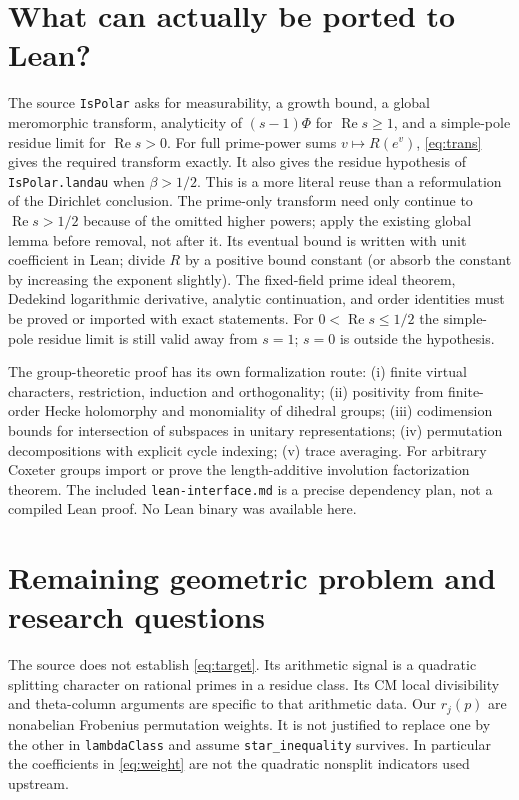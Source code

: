 \documentclass[11pt]{article}
\theoremstyle{remark}\newtheorem{remark}[theorem]{Remark}
\newcommand{\Rea}{\operatorname{Re}}
\begin{document}
\section{What can actually be ported to Lean?}
The source \texttt{IsPolar} asks for measurability, a growth bound, a global meromorphic transform, analyticity of $(s-1)\Phi$ for $\Rea s\ge1$, and a simple-pole residue limit for $\Rea s>0$. For full prime-power sums $v\mapsto R(e^v)$, \eqref{eq:trans} gives the required transform exactly. It also gives the residue hypothesis of \texttt{IsPolar.landau} when $\beta>1/2$. This is a more literal reuse than a reformulation of the Dirichlet conclusion. The prime-only transform need only continue to $\Rea s>1/2$ because of the omitted higher powers; apply the existing global lemma before removal, not after it. Its eventual bound is written with unit coefficient in Lean; divide $R$ by a positive bound constant (or absorb the constant by increasing the exponent slightly). The fixed-field prime ideal theorem, Dedekind logarithmic derivative, analytic continuation, and order identities must be proved or imported with exact statements. For $0<\Rea s\le1/2$ the simple-pole residue limit is still valid away from $s=1$; $s=0$ is outside the hypothesis.

The group-theoretic proof has its own formalization route: (i) finite virtual characters, restriction, induction and orthogonality; (ii) positivity from finite-order Hecke holomorphy and monomiality of dihedral groups; (iii) codimension bounds for intersection of subspaces in unitary representations; (iv) permutation decompositions with explicit cycle indexing; (v) trace averaging. For arbitrary Coxeter groups import or prove the length-additive involution factorization theorem. The included \texttt{lean-interface.md} is a precise dependency plan, not a compiled Lean proof. No Lean binary was available here.

\section{Remaining geometric problem and research questions}
The source does not establish \eqref{eq:target}. Its arithmetic signal is a quadratic splitting character on rational primes in a residue class. Its CM local divisibility and theta-column arguments are specific to that arithmetic data. Our $r_j(p)$ are nonabelian Frobenius permutation weights. It is not justified to replace one by the other in \texttt{lambdaClass} and assume \texttt{star\_inequality} survives. In particular the coefficients in \eqref{eq:weight} are not the quadratic nonsplit indicators used upstream.
\end{document}
